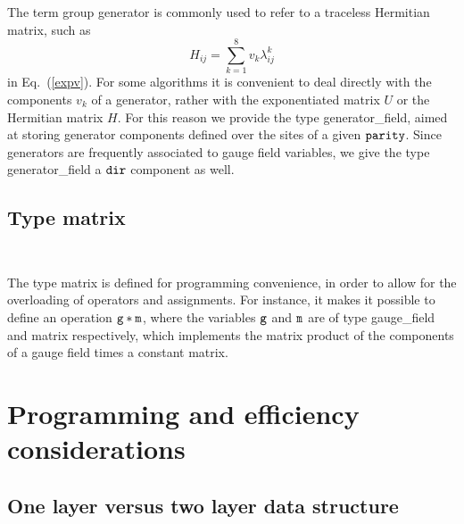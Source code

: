 The term group generator is commonly used to refer to a traceless
Hermitian matrix, such as 
%
\begin{equation}
H_{ij}= \sum_{k=1}^8  v_k \lambda^k_{ij} 
\label{generator}
\end{equation}
%
in Eq.~(\ref{expv}).  For some algorithms it is convenient to deal
directly with the components $v_k$ of a generator, rather with
the exponentiated matrix $U$ or the Hermitian matrix $H$.  For this
reason we provide the type generator\_field, aimed at storing generator
components defined over the sites of a given {$\tt parity$}.  Since generators
are frequently associated to gauge field variables, we give the
type generator\_field a $\tt dir$ component as well.

\subsection{Type matrix}              
\label{typem}
                                         
\vskip 4mm
{\baselineskip 5mm \tt
{}
}

The type matrix is defined for programming convenience,
in order to allow for the overloading of operators and assignments.
For instance, it makes it possible to define an operation $\tt g*m $, 
where the variables $\tt g$ and $\tt m$
are of type gauge\_field and matrix respectively, 
which implements the matrix product of the components of a gauge
field times a constant matrix.

\section{Programming and efficiency considerations}
\label{programmingand}

\subsection{One layer versus two layer data structure}
\label{onelayer}

